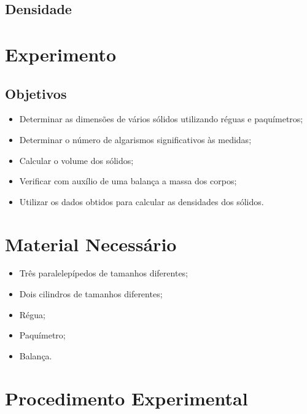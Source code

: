 \subsection{Densidade}


\section{Experimento}

\subsection{Objetivos}

\begin{itemize}
     \item Determinar as dimensões de vários sólidos utilizando réguas e paquímetros;
     \item Determinar o número de algarismos significativos às medidas;
     \item Calcular o volume dos sólidos;
     \item Verificar com auxílio de uma balança a massa dos corpos;
     \item Utilizar os dados obtidos para calcular as densidades dos sólidos.
\end{itemize}

\section{Material Necessário}

\begin{itemize}
	\item Três paralelepípedos de tamanhos diferentes;
	\item Dois cilindros de tamanhos diferentes;
	\item Régua;
	\item Paquímetro;
	\item Balança.
\end{itemize}

\section{Procedimento Experimental}

